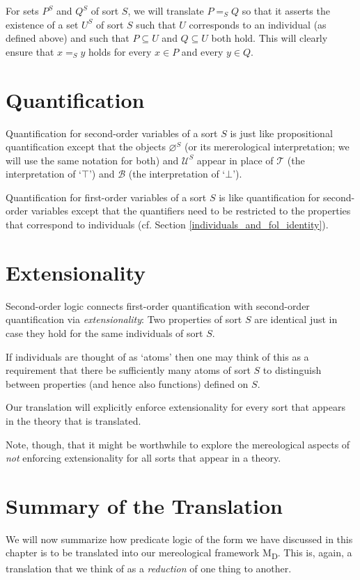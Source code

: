 \documentclass[12pt]{book}
\begin{document}
For sets $P^S$ and $Q^S$ of sort $S$, we will translate $P =_S Q$ so that it asserts the existence of a set $U^S$ of sort $S$ such that $U$ corresponds to an individual (as defined above) and such that $P \subseteq U$ and $Q \subseteq U$ both hold. This will clearly ensure that $x =_S y$ holds for every $x \in P$ and every $y \in Q$.

\section{Quantification} \label{quantification}
Quantification for second-order variables of a sort $S$ is just like propositional quantification except that the objects $\varnothing^S$ (or its mererological interpretation; we will use the same notation for both) and $\mathcal{U}^S$ appear in place of $\mathcal{T}$ (the interpretation of `$\top$') and $\mathcal{B}$ (the interpretation of `$\bot$').

Quantification for first-order variables of a sort $S$ is like quantification for second-order variables except that the quantifiers need to be restricted to the properties that correspond to individuals (cf. Section \ref{individuals_and_fol_identity}).

\section{Extensionality} \label{extensionality}
Second-order logic connects first-order quantification with second-order quantification via \textit{extensionality}: Two properties of sort $S$ are identical just in case they hold for the same individuals of sort $S$.

If individuals are thought of as `atoms' then one may think of this as a requirement that there be sufficiently many atoms of sort $S$ to distinguish between properties (and hence also functions) defined on $S$.

Our translation will explicitly enforce extensionality for every sort that appears in the theory that is translated.

Note, though, that it might be worthwhile to explore the mereological aspects of \textit{not} enforcing extensionality for all sorts that appear in a theory.

\section{Summary of the Translation} \label{translation}
We will now summarize how predicate logic of the form we have discussed in this chapter is to be translated into our mereological framework M\textsubscript{D}. This is, again, a translation that we think of as a \textit{reduction} of one thing to another.
\end{document}
